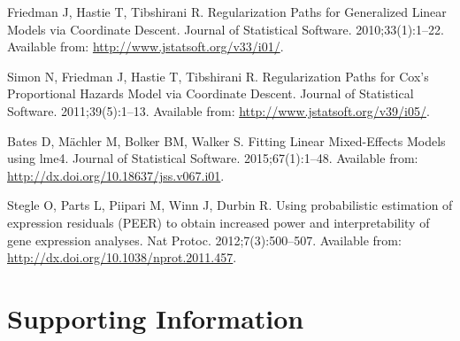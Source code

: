 \documentclass[10pt,letterpaper]{article}
\begin{document}
\begin{thebibliography}{10}
Friedman J, Hastie T, Tibshirani R.
\newblock Regularization Paths for Generalized Linear Models via Coordinate
  Descent.
\newblock Journal of Statistical Software. 2010;33(1):1--22.
\newblock Available from: \url{http://www.jstatsoft.org/v33/i01/}.

Simon N, Friedman J, Hastie T, Tibshirani R.
\newblock Regularization Paths for Cox's Proportional Hazards Model via
  Coordinate Descent.
\newblock Journal of Statistical Software. 2011;39(5):1--13.
\newblock Available from: \url{http://www.jstatsoft.org/v39/i05/}.

Bates D, M{\"a}chler M, Bolker BM, Walker S.
\newblock Fitting Linear Mixed-Effects Models using {lme4}.
\newblock Journal of Statistical Software. 2015;67(1):1--48.
\newblock Available from: \url{http://dx.doi.org/10.18637/jss.v067.i01}.

Stegle O, Parts L, Piipari M, Winn J, Durbin R.
\newblock Using probabilistic estimation of expression residuals ({PEER}) to
  obtain increased power and interpretability of gene expression analyses.
\newblock Nat Protoc. 2012;7(3):500--507.
\newblock Available from: \url{http://dx.doi.org/10.1038/nprot.2011.457}.

\end{thebibliography}


\section*{Supporting Information}
\end{document}
